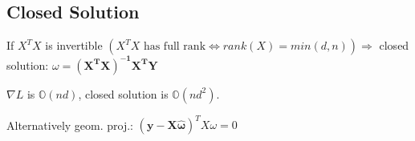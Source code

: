 \subsection{Closed Solution}

If $X^TX $ is invertible $ (X^TX\text{ has full rank} \Leftrightarrow rank(X) = min(d,n)) \Rightarrow$ closed solution: $\omega = \boldsymbol{(X^TX)^{-1}X^TY}$

$\nabla L$ is $\mathbb{O}(nd)$, closed solution is $\mathbb{O}(nd^2)$.

Alternatively geom. proj.: $(\boldsymbol{y - X\hat{\omega}})^TX\omega = 0$